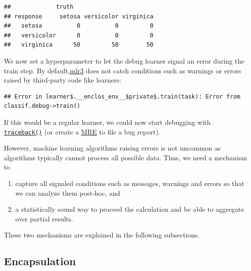 \documentclass[]{scrbook}
\newenvironment{Shaded}{\begin{snugshade}}{\end{snugshade}}
\newcommand{\DataTypeTok}[1]{\textcolor[rgb]{0.13,0.29,0.53}{#1}}
\newcommand{\DecValTok}[1]{\textcolor[rgb]{0.00,0.00,0.81}{#1}}
\newcommand{\KeywordTok}[1]{\textcolor[rgb]{0.13,0.29,0.53}{\textbf{#1}}}
\newcommand{\NormalTok}[1]{#1}
\newcommand{\OperatorTok}[1]{\textcolor[rgb]{0.81,0.36,0.00}{\textbf{#1}}}
\newcommand{\StringTok}[1]{\textcolor[rgb]{0.31,0.60,0.02}{#1}}
\providecommand{\tightlist}{%
  \setlength{\itemsep}{0pt}\setlength{\parskip}{0pt}}
\renewenvironment{Shaded} {\begin{snugshade}\small} {\end{snugshade}}
\begin{document}
\begin{verbatim}
##             truth
## response     setosa versicolor virginica
##   setosa          0          0         0
##   versicolor      0          0         0
##   virginica      50         50        50
\end{verbatim}

We now set a hyperparameter to let the debug learner signal an error during the train step.
By default,\href{https://github.com/mlr-org/mlr3}{mlr3} does not catch conditions such as warnings or errors raised by third-party code like learners:

\begin{Shaded}
\end{Shaded}

\begin{verbatim}
## Error in learner$.__enclos_env__$private$.train(task): Error from classif.debug->train()
\end{verbatim}

If this would be a regular learner, we could now start debugging with \href{https://www.rdocumentation.org/packages/base/topics/traceback}{\texttt{traceback()}} (or create a \href{https://stackoverflow.com/help/minimal-reproducible-example}{MRE} to file a bug report).

However, machine learning algorithms raising errors is not uncommon as algorithms typically cannot process all possible data.
Thus, we need a mechanism to

\begin{enumerate}
\def\labelenumi{\arabic{enumi}.}
\tightlist
\item
  capture all signaled conditions such as messages, warnings and errors so that we can analyze them post-hoc, and
\item
  a statistically sound way to proceed the calculation and be able to aggregate over partial results.
\end{enumerate}

These two mechanisms are explained in the following subsections.

\hypertarget{encapsulation}{%
\subsection{Encapsulation}\label{encapsulation}}
\end{document}
